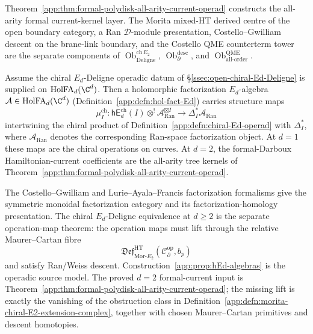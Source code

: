 \begin{rmk}
\label{app:rmk:tree-kernel-not-global-deligne}
Theorem~\ref{app:thm:formal-polydisk-all-arity-current-operad}
constructs the all-arity formal current-kernel layer.  The Morita
mixed-HT derived centre of the open boundary category, a Ran
\(\mathcal D\)-module presentation, Costello--Gwilliam descent on the
brane-link boundary, and the Costello QME counterterm tower are the
separate components of
\(\operatorname{Ob}^{\mathrm{ch}\,E_2}_{\mathrm{Deligne}}\),
\(\operatorname{Ob}^{\mathrm{desc}}_{\partial}\), and
\(\operatorname{Ob}^{\mathrm{QME}}_{\mathrm{all\mbox{-}order}}\).
\end{rmk}

\begin{constr}\label{app:prop:hEd-algebras}
Assume the chiral \(E_d\)-Deligne operadic datum of
\S\ref{ssec:open-chiral-Ed-Deligne} is supplied on
\(\mathrm{HolFA}_d(\C^d)\).  Then a holomorphic factorization
\(E_d\)-algebra
\(\mathcal A\in\mathrm{HolFA}_d(\C^d)\)
(Definition~\ref{app:defn:hol-fact-Ed}) carries structure maps
\[
  \mu^{\mathrm{ch}}_I\colon
   \mathsf{hE}_d^{\mathrm{ch}}(I)\otimes^!\mathcal A_{\mathrm{Ran}}^{\boxtimes I}
   \longrightarrow\Delta_I^*\mathcal A_{\mathrm{Ran}}
\]
intertwining the chiral product of
Definition~\ref{app:defn:chiral-Ed-operad} with $\Delta_I^*$, where
\(\mathcal A_{\mathrm{Ran}}\) denotes the corresponding Ran-space
factorization object.  At \(d=1\) these maps are the chiral operations
on curves.  At \(d=2\), the formal-Darboux Hamiltonian-current
coefficients are the all-arity tree kernels of
Theorem~\ref{app:thm:formal-polydisk-all-arity-current-operad}.
\end{constr}

\begin{rmk}
The Costello--Gwilliam and Lurie--Ayala--Francis factorization
formalisms give the symmetric monoidal factorization category and its
factorization-homology presentation.  The chiral \(E_d\)-Deligne
equivalence at \(d\geq2\) is the separate operation-map theorem: the
operation maps must lift through the relative
Maurer--Cartan fibre
\[
  \mathfrak{Def}^{\mathrm{HT}}_{\mathrm{Mor}\mbox{-}E_2}
    (\mathcal C^{\mathrm{op}}_\partial,b_p)
\]
and satisfy Ran/Weiss descent.  Construction~\ref{app:prop:hEd-algebras}
is the operadic source model.  The proved \(d=2\) formal-current input is
Theorem~\ref{app:thm:formal-polydisk-all-arity-current-operad}; the
missing lift is exactly the vanishing of the obstruction class in
Definition~\ref{app:defn:morita-chiral-E2-extension-complex}, together
with chosen Maurer--Cartan primitives and descent homotopies.
\end{rmk}

